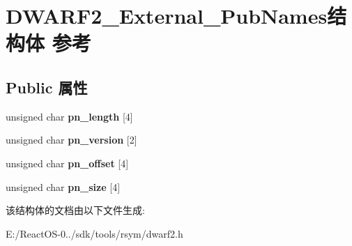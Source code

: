 \hypertarget{struct_d_w_a_r_f2___external___pub_names}{}\section{D\+W\+A\+R\+F2\+\_\+\+External\+\_\+\+Pub\+Names结构体 参考}
\label{struct_d_w_a_r_f2___external___pub_names}
\subsection*{Public 属性}
\begin{DoxyCompactItemize}
\item 
\mbox{\label{struct_d_w_a_r_f2___external___pub_names_a8217bce873a75025c15e5f9767c2fb0e}} 
unsigned char {\bfseries pn\+\_\+length} \mbox{[}4\mbox{]}
\item 
\mbox{\label{struct_d_w_a_r_f2___external___pub_names_ace003098e9e90e970124f888426a9aff}} 
unsigned char {\bfseries pn\+\_\+version} \mbox{[}2\mbox{]}
\item 
\mbox{\label{struct_d_w_a_r_f2___external___pub_names_a5a6b6d94aadcaaa6f206974ace42edc4}} 
unsigned char {\bfseries pn\+\_\+offset} \mbox{[}4\mbox{]}
\item 
\mbox{\label{struct_d_w_a_r_f2___external___pub_names_a5ea3e87a335c2393bec2c13d2c2d318e}} 
unsigned char {\bfseries pn\+\_\+size} \mbox{[}4\mbox{]}
\end{DoxyCompactItemize}


该结构体的文档由以下文件生成\+:\begin{DoxyCompactItemize}
\item 
E\+:/\+React\+O\+S-\/0../sdk/tools/rsym/dwarf2.\+h\end{DoxyCompactItemize}
